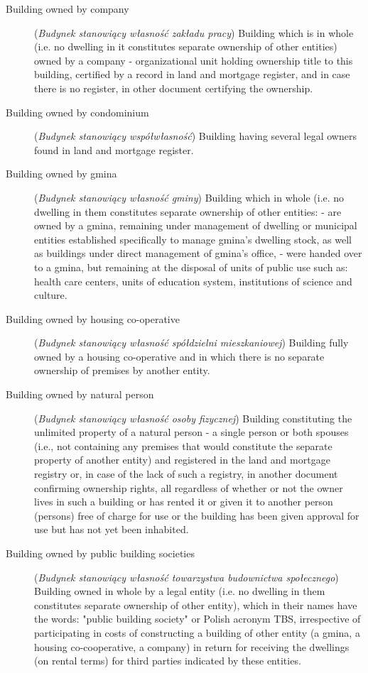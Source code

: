\documentclass[12pt,a4paper]{article}
\begin{document}
\begin{description}
\item[Building owned by company] (\textit{Budynek stanowiący własność zakładu pracy}) Building which is in whole (i.e. no dwelling in it constitutes separate ownership of other entities) owned by a company - organizational unit holding ownership title to this building, certified by a record in land and mortgage register, and in case there is no register, in other document certifying the ownership.
\item[Building owned by condominium] (\textit{Budynek stanowiący współwłasność}) Building having several legal owners found in land and mortgage register.
\item[Building owned by gmina] (\textit{Budynek stanowiący własność gminy}) Building which in whole (i.e. no dwelling in them constitutes separate ownership of other entities: - are owned by a gmina, remaining under management of dwelling or municipal entities established specifically to manage gmina's dwelling stock, as well as buildings under direct management of gmina's office, - were handed over to a gmina, but remaining at the disposal of units of public use such as: health care centers, units of education system, institutions of science and culture.
\item[Building owned by housing co-operative] (\textit{Budynek stanowiący własność spółdzielni mieszkaniowej}) Building fully owned by a housing co-operative and in which there is no separate ownership of premises by another entity.
\item[Building owned by natural person] (\textit{Budynek stanowiący własność osoby fizycznej}) Building constituting the unlimited property of a natural person - a single person or both spouses (i.e., not containing any premises that would constitute the separate property of another entity) and registered in the land and mortgage registry or, in case of the lack of such a registry, in another document confirming ownership rights, all regardless of whether or not the owner lives in such a building or has rented it or given it to another person (persons) free of charge for use or the building has been given approval for use but has not yet been inhabited.
\item[Building owned by public building societies] (\textit{Budynek stanowiący własność towarzystwa budownictwa społecznego}) Building owned in whole by a legal entity (i.e. no dwelling in them constitutes separate ownership of other entity), which in their names have the words: "public building society" or Polish acronym TBS, irrespective of participating in costs of constructing a building of other entity (a gmina, a housing co-cooperative, a company) in return for receiving the dwellings (on rental terms) for third parties indicated by these entities.

\end{description}
\end{document}
